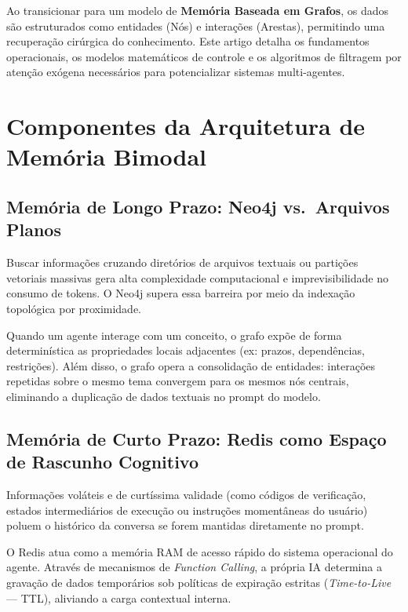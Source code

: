 \documentclass[11pt,a4paper]{article}
\begin{document}
Ao transicionar para um modelo de \textbf{Memória Baseada em Grafos}, os dados são estruturados
como entidades (Nós) e interações (Arestas), permitindo uma recuperação cirúrgica do conhecimento.
Este artigo detalha os fundamentos operacionais, os modelos matemáticos de controle e os
algoritmos de filtragem por atenção exógena necessários para potencializar sistemas
multi-agentes.


\section{Componentes da Arquitetura de Memória Bimodal}

\subsection{Memória de Longo Prazo: Neo4j vs.\ Arquivos Planos}

Buscar informações cruzando diretórios de arquivos textuais ou partições vetoriais massivas gera
alta complexidade computacional e imprevisibilidade no consumo de tokens. O Neo4j supera essa
barreira por meio da indexação topológica por proximidade.

Quando um agente interage com um conceito, o grafo expõe de forma determinística as propriedades
locais adjacentes (ex: prazos, dependências, restrições). Além disso, o grafo opera a
consolidação de entidades: interações repetidas sobre o mesmo tema convergem para os mesmos nós
centrais, eliminando a duplicação de dados textuais no prompt do modelo.

\subsection{Memória de Curto Prazo: Redis como Espaço de Rascunho Cognitivo}

Informações voláteis e de curtíssima validade (como códigos de verificação, estados intermediários
de execução ou instruções momentâneas do usuário) poluem o histórico da conversa se forem mantidas
diretamente no prompt.

O Redis atua como a memória RAM de acesso rápido do sistema operacional do agente. Através de
mecanismos de \textit{Function Calling}, a própria IA determina a gravação de dados temporários
sob políticas de expiração estritas (\textit{Time-to-Live} — TTL), aliviando a carga contextual
interna.
\end{document}
